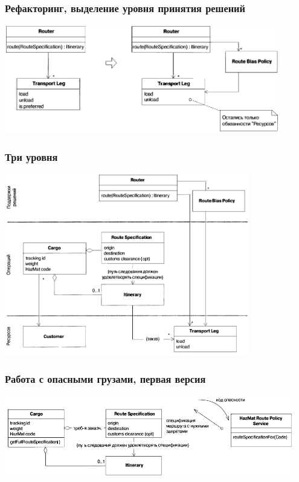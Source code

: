 \documentclass[xetex,mathserif,serif]{beamer}
\begin{document}
	\begin{frame}
		\frametitle{Рефакторинг, выделение уровня принятия решений}
		\begin{center}
			\includegraphics[width=0.9\textwidth]{cargoThirdLayerRefactoring.png}
		\end{center}
	\end{frame}

	\begin{frame}
		\frametitle{Три уровня}
		\begin{center}
			\includegraphics[width=0.8\textwidth]{cargoThreeLayers.png}
		\end{center}
	\end{frame}

	\begin{frame}
		\frametitle{Работа с опасными грузами, первая версия}
		\begin{center}
			\includegraphics[width=0.95\textwidth]{cargoHazMatWrong.png}
		\end{center}
	\end{frame}
\end{document}

